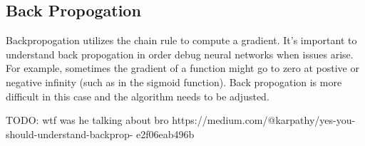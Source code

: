 \subsection*{Back Propogation}
Backpropogation utilizes the chain rule to compute a gradient. It's important to understand back propogation in order debug neural networks when issues arise. For example, sometimes the gradient of a function might go to zero at postive or negative infinity (such as in the sigmoid function). Back propogation is more difficult in this case and the algorithm needs to be adjusted.

TODO: wtf was he talking about bro https://medium.com/@karpathy/yes-you-should-understand-backprop-
e2f06eab496b

